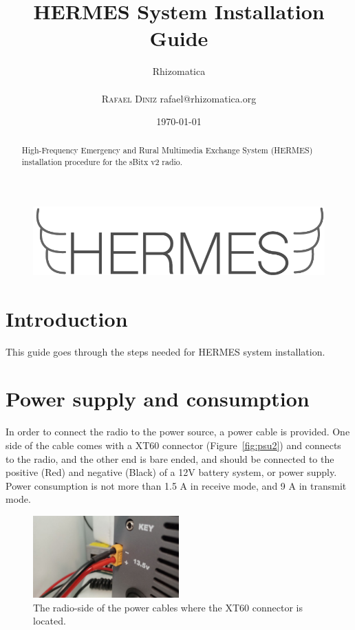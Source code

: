 \documentclass[11pt,a4paper]{article}
\title{HERMES System Installation Guide}
\author{
       \large
       \mbox{Rhizomatica} \\
       \mbox{}\\ 
       \textsc{Rafael Diniz}
        rafael@rhizomatica.org\\
}
\date{\today}
\begin{document}
\maketitle

\begin{figure}[!ht]
\includegraphics[width=1\textwidth]{pictures/logoh.png}
\end{figure}

\begin{abstract}

  High-Frequency Emergency and Rural Multimedia Exchange System (HERMES) installation procedure for the sBitx v2 radio.

\end{abstract}


\tableofcontents

\setlength{\parindent}{0em}
\setlength{\parskip}{1em}

\section{Introduction}

This guide goes through the steps needed for HERMES system installation.


\section{Power supply and consumption}

In order to connect the radio to the power source, a power cable is provided. One side of the
cable comes with a XT60 connector (Figure~\ref{fig:psu2}) and connects to the radio, and the other end is bare ended,
and should be connected to the positive (Red) and negative (Black) of a 12V battery system, or power
supply. Power consumption is not more than 1.5 A in receive mode, and 9 A in transmit mode.

\begin{figure}[!ht]
  \centering
  \includegraphics[width=0.5\textwidth]{pictures/psu1.jpeg}
  \caption{The radio-side of the power cables where the XT60 connector is located.}
  \label{fig:psu1}
\end{figure}
\end{document}
